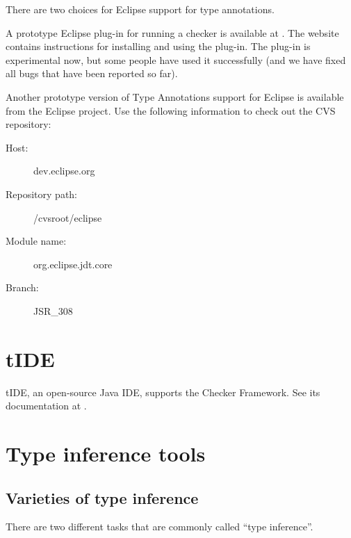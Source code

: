 There are two choices for Eclipse support for type annotations.

A prototype Eclipse plug-in for running a checker is available at
.  
The website contains instructions for installing and using the plug-in.
The plug-in is
experimental now, but some people have used it successfully (and we have fixed
all bugs that have been reported so far).

Another prototype version of Type Annotations support for Eclipse is
available from the Eclipse project.  Use the following information to check
out the CVS repository:
\begin{description}
\item[Host:]                 dev.eclipse.org
\item[Repository path:] /cvsroot/eclipse
\item[Module name:]    org.eclipse.jdt.core
\item[Branch:]             JSR\_308
\end{description}


\section{tIDE\label{tide}}

tIDE, an open-source Java IDE, supports the Checker Framework.  See its
documentation at .


\section{Type inference tools\label{type-inference-tools}}

\subsection{Varieties of type inference}

There are two different tasks that are commonly called ``type inference''.


